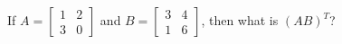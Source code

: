 
%
%
%
%
% 
% 

\question If $A = \left[ \begin{array}{cc} 
1 & 2 \\ 
3 & 0
\end{array}\right]$ and 
$B = \left[ \begin{array}{cc}
3 & 4 \\
1 & 6
\end{array} \right]$, then what is $(AB)^{T}$?

\insertQR{}

\ifprintanswers
\fi 

